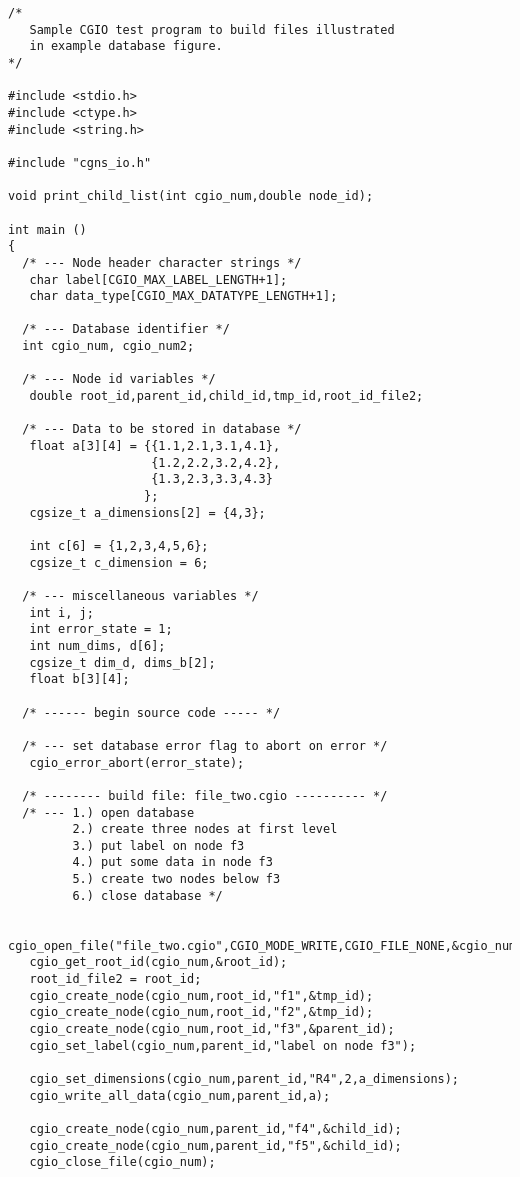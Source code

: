 \begin{verbatim}
/*
   Sample CGIO test program to build files illustrated
   in example database figure.
*/

#include <stdio.h>
#include <ctype.h>
#include <string.h>

#include "cgns_io.h"

void print_child_list(int cgio_num,double node_id);

int main ()
{
  /* --- Node header character strings */
   char label[CGIO_MAX_LABEL_LENGTH+1];
   char data_type[CGIO_MAX_DATATYPE_LENGTH+1];

  /* --- Database identifier */
  int cgio_num, cgio_num2;

  /* --- Node id variables */
   double root_id,parent_id,child_id,tmp_id,root_id_file2;

  /* --- Data to be stored in database */
   float a[3][4] = {{1.1,2.1,3.1,4.1},
                    {1.2,2.2,3.2,4.2},
                    {1.3,2.3,3.3,4.3}
                   };
   cgsize_t a_dimensions[2] = {4,3};

   int c[6] = {1,2,3,4,5,6};
   cgsize_t c_dimension = 6;

  /* --- miscellaneous variables */
   int i, j;
   int error_state = 1;
   int num_dims, d[6];
   cgsize_t dim_d, dims_b[2];
   float b[3][4];

  /* ------ begin source code ----- */

  /* --- set database error flag to abort on error */
   cgio_error_abort(error_state);

  /* -------- build file: file_two.cgio ---------- */
  /* --- 1.) open database
         2.) create three nodes at first level
         3.) put label on node f3
         4.) put some data in node f3
         5.) create two nodes below f3
         6.) close database */

   cgio_open_file("file_two.cgio",CGIO_MODE_WRITE,CGIO_FILE_NONE,&cgio_num);
   cgio_get_root_id(cgio_num,&root_id);
   root_id_file2 = root_id;
   cgio_create_node(cgio_num,root_id,"f1",&tmp_id);
   cgio_create_node(cgio_num,root_id,"f2",&tmp_id);
   cgio_create_node(cgio_num,root_id,"f3",&parent_id);
   cgio_set_label(cgio_num,parent_id,"label on node f3");

   cgio_set_dimensions(cgio_num,parent_id,"R4",2,a_dimensions);
   cgio_write_all_data(cgio_num,parent_id,a);

   cgio_create_node(cgio_num,parent_id,"f4",&child_id);
   cgio_create_node(cgio_num,parent_id,"f5",&child_id);
   cgio_close_file(cgio_num);


\end{verbatim}
